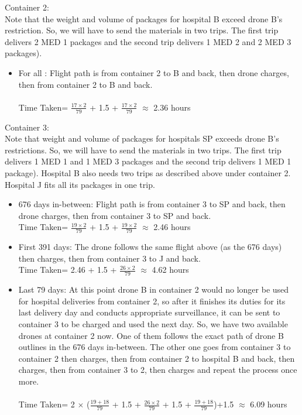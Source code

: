 Container 2:\\
Note that the weight and volume of packages for hospital B exceed drone B's restriction. So, we will have to send the materials in two trips. The first trip delivers 2 MED 1 packages and the second trip delivers 1 MED 2 and 2 MED 3 packages).\\  
\begin{itemize}
    \item For all : Flight path is from container 2 to B and back, then drone charges, then from container 2 to B and back.\\ 
    \\
    Time Taken= $\frac{17 \times 2}{79}$ + 1.5 + $\frac{17 \times 2}{79}$ $\approx$ 2.36 hours
\end{itemize}

Container 3:\\
Note that weight and volume of packages for hospitals SP exceeds drone B's restrictions. So, we will have to send the materials in two trips. The first trip delivers 1 MED 1 and 1 MED 3 packages and the second trip delivers 1 MED 1 package). Hospital B also needs two trips as described above under container 2. Hospital J fits all its packages in one trip.\\

\begin{itemize}
    \item 676 days in-between: Flight path is from container 3 to SP and back, then drone charges, then from container 3 to SP and back.\\ 
    Time Taken= $\frac{19 \times 2}{79}$ + 1.5 + $\frac{19 \times 2}{79}$ $\approx$ 2.46 hours
    \item First 391 days: The drone follows the same flight above (as the 676 days) then charges, then from container 3 to J and back. 
    \\
    Time Taken= 2.46 + 1.5 + $\frac{26 \times 2}{79}$ $\approx$ 4.62 hours
    \item Last 79 days: At this point drone B in container 2 would no longer be used for hospital deliveries from container 2, so after it finishes its duties for its last delivery day and conducts appropriate surveillance, it can be sent to container 3 to be charged and used the next day. So, we have two available drones at container 2 now. One of them follows the exact path of drone B outlines in the 676 days in-between. The other one goes from container 3 to container 2 then charges, then from container 2 to hospital B and back, then charges, then from container 3 to 2, then charges and repeat the process once more. \\
    \\
     Time Taken= 2 $\times$ ($\frac{19+18}{79}$ + 1.5 + $\frac{26 \times 2}{79}$ + 1.5 + $\frac{19+18}{79}$)+1.5 $\approx$ 6.09 hours
    
    
\end{itemize}

